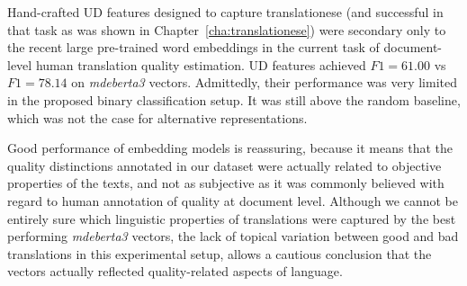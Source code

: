 Hand-crafted UD features designed to capture translationese (and successful in that task as was shown in Chapter~\ref{cha:translationese}) were secondary only to the recent large pre-trained word embeddings in the current task of document-level human translation quality estimation. UD features achieved $F1=61.00$ vs $F1=78.14$ on \textit{mdeberta3} vectors.
Admittedly, their performance was very limited in the proposed binary classification setup. It was still above the random baseline, which was not the case for alternative representations. 

Good performance of embedding models is reassuring, because it means that the quality distinctions annotated in our dataset were actually related to objective properties of the texts, and not as subjective as it was commonly believed with regard to human annotation of quality at document level. 
Although we cannot be entirely sure which linguistic properties of translations were captured by the best performing \textit{mdeberta3} vectors, the lack of topical variation between good and bad translations in this experimental setup, allows a cautious conclusion that the vectors actually reflected quality-related aspects of language. 

